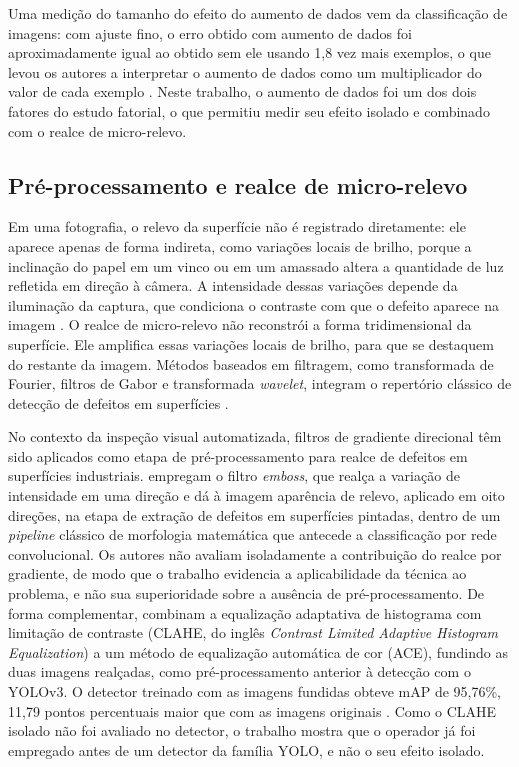 \documentclass[
    12pt,                %
    openright,           %
    oneside,             %
    a4paper,             %
    english,             %
    brazil               %
]{abntex2}
\begin{document}
Uma medição do tamanho do efeito do
aumento de dados vem da classificação de imagens: com ajuste fino, o erro
obtido com aumento de dados foi aproximadamente igual ao obtido
sem ele usando 1,8 vez mais exemplos, o que levou os autores a
interpretar o aumento de dados como um multiplicador do valor
de cada exemplo \cite{Hoiem2021}. Neste trabalho, o aumento de
dados foi um dos dois fatores do estudo fatorial, o que
permitiu medir seu efeito isolado e combinado com o realce de
micro-relevo.

\subsection{Pré-processamento e realce de micro-relevo}
\label{subsec:fotometria}

Em uma fotografia, o relevo da superfície não é registrado
diretamente: ele aparece apenas de forma indireta, como variações
locais de brilho, porque a inclinação do papel em um vinco ou em
um amassado altera a quantidade de luz refletida em direção à câmera.
A intensidade dessas variações depende da iluminação da captura, que
condiciona o contraste com que o defeito aparece na imagem
\cite{Zheng2021}. O realce de micro-relevo não reconstrói a forma
tridimensional da superfície. Ele amplifica essas variações locais de
brilho, para que se destaquem do restante da imagem. Métodos
baseados em filtragem, como transformada de Fourier, filtros de Gabor
e transformada \textit{wavelet}, integram o repertório clássico de
detecção de defeitos em superfícies \cite{Chen2021}.

No contexto da inspeção visual automatizada, filtros de gradiente
direcional têm sido aplicados como etapa de pré-processamento para
realce de defeitos em superfícies industriais. 
empregam o filtro \textit{emboss}, que realça a variação de intensidade
em uma direção e dá à imagem aparência de relevo, aplicado em oito
direções, na etapa de extração
de defeitos em superfícies pintadas, dentro de um \textit{pipeline} clássico de
morfologia matemática que antecede a classificação por rede
convolucional. Os autores não avaliam isoladamente a contribuição do
realce por gradiente, de modo que o trabalho evidencia a aplicabilidade
da técnica ao problema, e não sua superioridade sobre a ausência de
pré-processamento. De forma complementar,
 combinam a equalização adaptativa de histograma
com limitação de contraste (CLAHE, do inglês \textit{Contrast Limited
Adaptive Histogram Equalization}) a um método de equalização automática
de cor (ACE), fundindo as duas imagens realçadas, como
pré-processamento anterior à detecção com o YOLOv3. O detector treinado
com as imagens fundidas obteve mAP de 95,76\%, 11,79 pontos percentuais
maior que com as imagens originais \cite{Jiang2023}. Como o CLAHE
isolado não foi avaliado no detector, o trabalho mostra que o operador já foi
empregado antes de um detector da família YOLO, e não o seu efeito
isolado.
\end{document}
